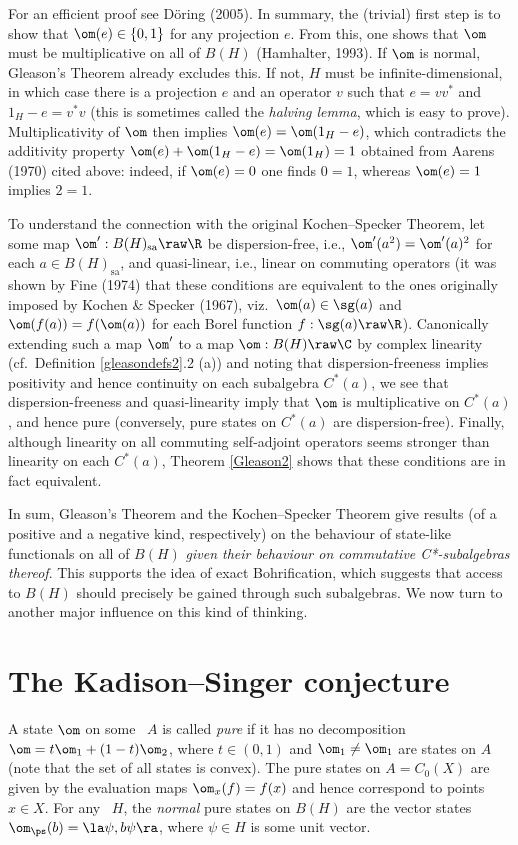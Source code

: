 \documentclass[12pt]{article}
\begin{document}
 For an efficient proof see  D\"{o}ring (2005). In summary, the (trivial) first step is to show that
 $\om(e)\in\{0,1\}$ for any projection $e$. From this, one shows that $\om$ must be multiplicative on all of $B(H)$ (Hamhalter, 1993). If $\om$ is normal, Gleason's Theorem already excludes this. If not, $H$ must be infinite-dimensional, in which case 
  there is a projection $e$ and an operator $v$ such that $e=vv^*$ and $1_H-e=v^*v$ (this is sometimes called the \emph{halving lemma}, which is easy to prove).  Multiplicativity of $\om$ then implies   $\om(e)=\om(1_H-e)$, which 
contradicts the additivity property $\om(e)+\om(1_H-e)=\om(1_H)=1$ obtained from Aarens (1970) cited above: indeed, 
if $\om(e)=0$ one finds $0=1$, whereas $\om(e)=1$ implies $2=1$. 
 
  To understand the connection with the original 
  Kochen--Specker Theorem, let some map $\om':B(H)_{\mathrm{sa}}\raw\R$ be dispersion-free, i.e., $\om'(a^2)=\om'(a)^2$ for each 
 $a\in B(H)_{\mathrm{sa}}$, and quasi-linear, i.e., linear on commuting operators (it was shown by Fine (1974) that these conditions are equivalent to the ones originally imposed by Kochen \& Specker (1967), viz.\ $\om(a)\in\sg(a)$ and
 $\om(f(a))=f(\om(a))$ for each Borel function $f:\sg(a)\raw\R$).
 Canonically extending such a map $\om'$ to a map $\om:B(H)\raw\C$ by complex linearity 
 (cf.\ Definition \ref{gleasondefs2}.2 (a)) 
  and noting that
 dispersion-freeness implies positivity and hence continuity on each subalgebra $C^*(a)$, we see that 
  dispersion-freeness and quasi-linearity
  imply that $\om$ is multiplicative on $C^*(a)$, and hence pure (conversely, pure states on $C^*(a)$ are dispersion-free). Finally, although linearity on all commuting self-adjoint operators seems stronger than linearity on each $C^*(a)$, Theorem \ref{Gleason2} shows that these conditions are in fact equivalent. 
  
  In sum,  Gleason's Theorem and the Kochen--Specker Theorem  give results (of a positive and a negative kind, respectively) on the behaviour of state-like functionals on all of $B(H)$ \emph{given their behaviour on commutative C*-subalgebras thereof}. This supports the idea of exact Bohrification, which suggests that access to $B(H)$ should precisely be gained through such subalgebras. We now turn to another major influence on this kind of thinking.
\section{The Kadison--Singer conjecture}\label{KSC}
A state $\om$ on some \ca\ $A$ is called \emph{pure} if it has no decomposition
$\om=t\om_1+(1-t)\om_2$, where $t\in(0,1)$ and $\om_1\neq\om_1$ are states on $A$ (note that the set of all states is convex). The pure states on $A=C_0(X)$ are given by the evaluation maps $\om_x(f)=f(x)$ and hence correspond to points $x\in X$. For any \Hs\ $H$, the \emph{normal} pure states on $B(H)$ are the vector states $\om_{\ps}(b)=\la\psi,b\psi\ra$, where $\psi\in H$ is some unit vector.
\end{document}
